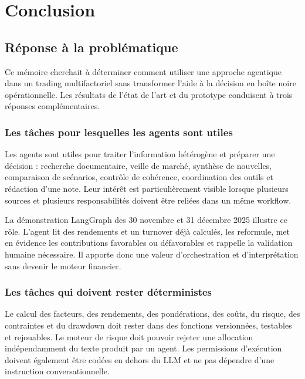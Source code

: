 \chapter{Conclusion}\label{cap:conclusion}

\section{Réponse à la problématique}

Ce mémoire cherchait à déterminer comment utiliser une approche agentique dans un trading multifactoriel sans transformer l'aide à la décision en boîte noire opérationnelle. Les résultats de l'état de l'art et du prototype conduisent à trois réponses complémentaires.

\subsection{Les tâches pour lesquelles les agents sont utiles}

Les agents sont utiles pour traiter l'information hétérogène et préparer une décision : recherche documentaire, veille de marché, synthèse de nouvelles, comparaison de scénarios, contrôle de cohérence, coordination des outils et rédaction d'une note. Leur intérêt est particulièrement visible lorsque plusieurs sources et plusieurs responsabilités doivent être reliées dans un même workflow.

La démonstration LangGraph des 30 novembre et 31 décembre 2025 illustre ce rôle. L'agent lit des rendements et un turnover déjà calculés, les reformule, met en évidence les contributions favorables ou défavorables et rappelle la validation humaine nécessaire. Il apporte donc une valeur d'orchestration et d'interprétation sans devenir le moteur financier.

\subsection{Les tâches qui doivent rester déterministes}

Le calcul des facteurs, des rendements, des pondérations, des coûts, du risque, des contraintes et du drawdown doit rester dans des fonctions versionnées, testables et rejouables. Le moteur de risque doit pouvoir rejeter une allocation indépendamment du texte produit par un agent. Les permissions d'exécution doivent également être codées en dehors du LLM et ne pas dépendre d'une instruction conversationnelle.

